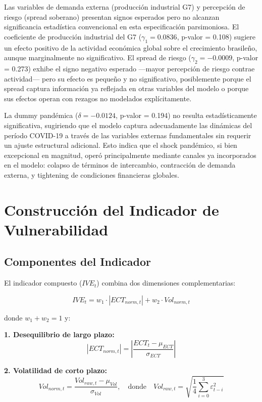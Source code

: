 \documentclass[3p,11pt]{elsarticle}
\begin{document}
Las variables de demanda externa (producción industrial G7) y percepción de riesgo (spread soberano) presentan signos esperados pero no alcanzan significancia estadística convencional en esta especificación parsimoniosa. El coeficiente de producción industrial del G7 ($\gamma_1 = 0.0836$, p-valor = 0.108) sugiere un efecto positivo de la actividad económica global sobre el crecimiento brasileño, aunque marginalmente no significativo. El spread de riesgo ($\gamma_2 = -0.0009$, p-valor = 0.273) exhibe el signo negativo esperado ---mayor percepción de riesgo contrae actividad--- pero su efecto es pequeño y no significativo, posiblemente porque el spread captura información ya reflejada en otras variables del modelo o porque sus efectos operan con rezagos no modelados explícitamente.

La dummy pandémica ($\delta = -0.0124$, p-valor = 0.194) no resulta estadísticamente significativa, sugiriendo que el modelo captura adecuadamente las dinámicas del período COVID-19 a través de las variables externas fundamentales sin requerir un ajuste estructural adicional. Esto indica que el shock pandémico, si bien excepcional en magnitud, operó principalmente mediante canales ya incorporados en el modelo: colapso de términos de intercambio, contracción de demanda externa, y tightening de condiciones financieras globales.

\section{Construcción del Indicador de Vulnerabilidad}

\subsection{Componentes del Indicador}

El indicador compuesto ($IVE_t$) combina dos dimensiones complementarias:

\begin{equation}
IVE_t = w_1 \cdot |ECT_{norm,t}| + w_2 \cdot Vol_{norm,t}
\end{equation}

donde $w_1 + w_2 = 1$ y:

\textbf{1. Desequilibrio de largo plazo:}
\begin{equation}
|ECT_{norm,t}| = \left|\frac{ECT_t - \mu_{ECT}}{\sigma_{ECT}}\right|
\end{equation}

\textbf{2. Volatilidad de corto plazo:}
\begin{equation}
Vol_{norm,t} = \frac{Vol_{raw,t} - \mu_{Vol}}{\sigma_{Vol}}, \quad \text{donde} \quad Vol_{raw,t} = \sqrt{\frac{1}{4} \sum_{i=0}^{3} \varepsilon_{t-i}^2}
\end{equation}
\end{document}
